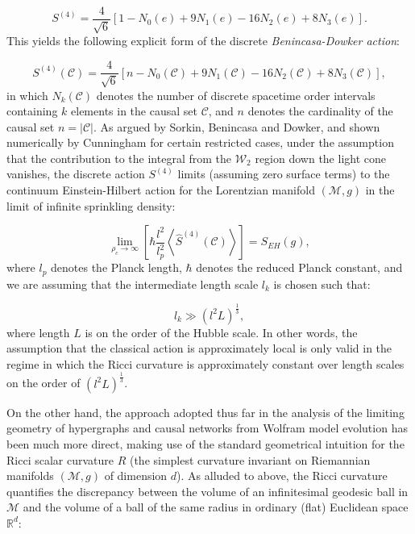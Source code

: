 \documentclass{article}
\begin{document}
\begin{equation}
S^{\left( 4 \right)} = \frac{4}{\sqrt{6}} \left[ 1 - N_0 \left( e \right) + 9 N_1 \left( e \right) - 16 N_2 \left( e \right) + 8 N_3 \left( e \right) \right].
\end{equation}
This yields the following explicit form of the discrete \textit{Benincasa-Dowker action}:

\begin{equation}
S^{\left( 4 \right)} \left( \mathcal{C} \right) = \frac{4}{\sqrt{6}} \left[ n - N_0 \left( \mathcal{C} \right) + 9 N_1 \left( \mathcal{C} \right) - 16 N_2 \left( \mathcal{C} \right) + 8 N_3 \left( \mathcal{C} \right) \right],
\end{equation}
in which ${N_k \left( \mathcal{C} \right)}$ denotes the number of discrete spacetime order intervals containing $k$ elements in the causal set ${\mathcal{C}}$, and $n$ denotes the cardinality of the causal set ${n = \left\lvert \mathcal{C} \right\rvert}$. As argued by Sorkin\cite{sorkin3}, Benincasa and Dowker\cite{benincasa}, and shown numerically by Cunningham\cite{cunningham} for certain restricted cases, under the assumption that the contribution to the integral from the ${\mathcal{W}_2}$ region down the light cone vanishes, the discrete action ${S^{\left( 4 \right)}}$ limits (assuming zero surface terms) to the continuum Einstein-Hilbert action for the Lorentzian manifold ${\left( \mathcal{M}, g \right)}$ in the limit of infinite sprinkling density:

\begin{equation}
\lim_{\rho_c \to \infty} \left[ \hbar \frac{l^2}{l_{p}^{2}} \left\langle \hat{S}^{\left( 4 \right)} \left( \mathcal{C} \right) \right\rangle \right] = S_{EH} \left( g \right),
\end{equation}
where ${l_{p}}$ denotes the Planck length, ${\hbar}$ denotes the reduced Planck constant, and we are assuming that the intermediate length scale ${l_k}$ is chosen such that:

\begin{equation}
l_k \gg \left( l^2 L \right)^{\frac{1}{3}},
\end{equation}
where length $L$ is on the order of the Hubble scale. In other words, the assumption that the classical action is approximately local is only valid in the regime in which the Ricci curvature is approximately constant over length scales on the order of ${\left( l^2 L \right)^{\frac{1}{3}}}$.

On the other hand, the approach adopted thus far in the analysis of the limiting geometry of hypergraphs and causal networks from Wolfram model evolution has been much more direct\cite{gorard}, making use of the standard geometrical intuition for the Ricci scalar curvature $R$ (the simplest curvature invariant on Riemannian manifolds ${\left( \mathcal{M}, g \right)}$ of dimension $d$). As alluded to above, the Ricci curvature quantifies the discrepancy between the volume of an infinitesimal geodesic ball in ${\mathcal{M}}$ and the volume of a ball of the same radius in ordinary (flat) Euclidean space ${\mathbb{R}^d}$\cite{ricci}:
\end{document}
